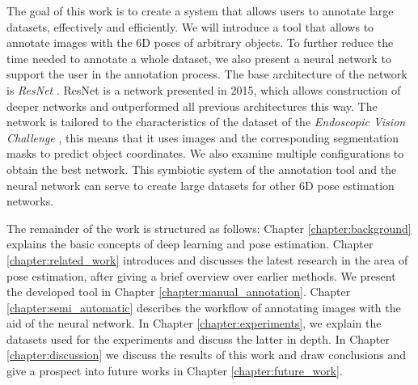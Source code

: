 The goal of this work is to create a system that allows users to annotate large datasets, effectively and efficiently. We will introduce a tool that allows to annotate images with the 6D poses of arbitrary objects. To further reduce the time needed to annotate a whole dataset, we also present a neural network to support the user in the annotation process. The base architecture of the network is \textit{ResNet} \cite{resnet}. ResNet is a network presented in 2015, which allows construction of deeper networks and outperformed all previous architectures this way. The network is tailored to the characteristics of the dataset of the \textit{Endoscopic Vision Challenge} \cite{endovis}, this means that it uses images and the corresponding segmentation masks to predict object coordinates. We also examine multiple configurations to obtain the best network. This symbiotic system of the annotation tool and the neural network can serve to create large datasets for other 6D pose estimation networks.

The remainder of the work is structured as follows: Chapter \ref{chapter:background} explains the basic concepts of deep learning and pose estimation. Chapter \ref{chapter:related_work} introduces and discusses the latest research in the area of pose estimation, after giving a brief overview over earlier methods. We present the developed tool in Chapter \ref{chapter:manual_annotation}. Chapter \ref{chapter:semi_automatic} describes the workflow of annotating images with the aid of the neural network. In Chapter \ref{chapter:experiments}, we explain the datasets used for the experiments and discuss the latter in depth. In Chapter \ref{chapter:discussion} we discuss the results of this work and draw conclusions and give a prospect into future works in Chapter \ref{chapter:future_work}.
